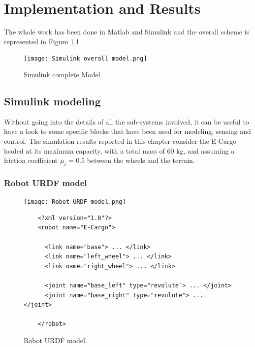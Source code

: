 \chapter{Implementation and Results}
\label{ch:chapter_five}%

The whole work has been done in Matlab and Simulink and the overall scheme is represented in Figure \ref{fig:SIMULINK complete Model}

\begin{figure}
    \centering
    \texttt{[image: Simulink overall model.png]}
    \caption{Simulink complete Model.}
    \label{fig:SIMULINK complete Model}
\end{figure}

\section{Simulink modeling}
\label{sec:Simulink modeling}

Without going into the details of all the sub-systems involved, it can be useful to have a look to some specific blocks that have been used for modeling, sensing and control.
The simulation results reported in this chapter consider the E-Cargo loaded at its maximum capacity, with a total mass of 60 kg, and assuming a friction coefficient $\mu_c = 0.5$ between the wheels and the terrain.

\subsection{Robot URDF model}
\label{subsec:Robot URDF model}

\begin{figure}
  \centering
  \begin{minipage}{0.35\textwidth}
    \centering
    \texttt{[image: Robot URDF model.png]} %
  \end{minipage}%
  \begin{minipage}{0.55\textwidth}
    \small %
    \begin{verbatim}
    <?xml version="1.0"?>
    <robot name="E-Cargo">
    
      <link name="base"> ... </link>
      <link name="left_wheel"> ... </link>
      <link name="right_wheel"> ... </link>
    
      <joint name="base_left" type="revolute"> ... </joint>
      <joint name="base_right" type="revolute"> ... </joint>
    
    </robot>
    \end{verbatim}
  \end{minipage}
  \caption{Robot URDF model.}
  \label{fig:Robot URDF model}
\end{figure}

